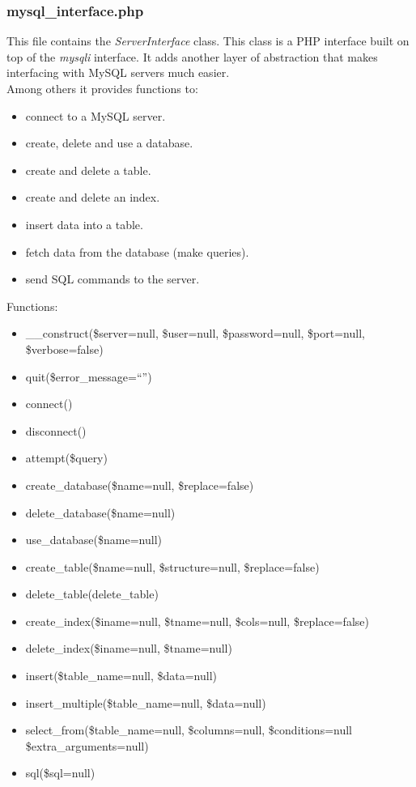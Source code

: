 \documentclass{article}
\begin{document}
\subsubsection{mysql\_interface.php}
This file contains the \textit{ServerInterface} class. This class is a PHP
interface built on top of the \textit{mysqli} interface. It adds another
layer of abstraction that makes interfacing with MySQL servers much easier.
\\Among others it provides functions to:
\begin{itemize}
	\item connect to a MySQL server.
	\item create, delete and use a database.
	\item create and delete a table.
	\item create and delete an index.
	\item insert data into a table.
	\item fetch data from the database (make queries).
	\item send SQL commands to the server.
\end{itemize}
Functions:
\begin{itemize}
	\item \_\_construct(\$server=null, \$user=null, \$password=null,
	\$port=null, \$verbose=false)
	\item quit(\$error\_message=\textquotedblleft\textquotedblright)
	\item connect()
	\item disconnect()
	\item attempt(\$query)
	\item create\_database(\$name=null, \$replace=false)
	\item delete\_database(\$name=null)
	\item use\_database(\$name=null)
	\item create\_table(\$name=null, \$structure=null, \$replace=false)
	\item delete\_table(delete\_table)
	\item create\_index(\$iname=null, \$tname=null, \$cols=null,
	\$replace=false)
	\item delete\_index(\$iname=null, \$tname=null)
	\item insert(\$table\_name=null, \$data=null)
	\item insert\_multiple(\$table\_name=null, \$data=null)
	\item select\_from(\$table\_name=null, \$columns=null, \$conditions=null
	\$extra\_arguments=null)
	\item sql(\$sql=null)
\end{itemize}
\end{document}
